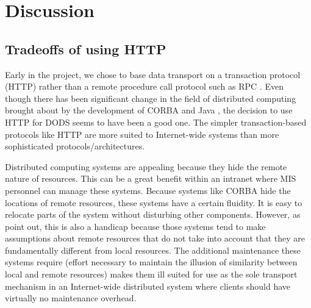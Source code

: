 \documentclass[12pt]{article}
\begin{document}
\section{Discussion}
\label{disc}

\subsection{Tradeoffs of using HTTP}
\label{http}

Early in the project, we chose to base data transport on a transaction
protocol (\acs{HTTP}) rather than a remote procedure call protocol such as
\ac{RPC} \cite{sun:rpc}. Even though there has been significant change in the
field of distributed computing brought about by the development of \ac{CORBA}
\cite{siegel:corba-prog} and Java \cite{harold:java-net}, the decision to use
\acs{HTTP} for \ac{DODS} seems to have been a good one. The simpler
transaction-based protocols like \acs{HTTP} are more suited to
Internet-wide systems than more sophisticated protocols/architectures.

Distributed computing systems are appealing because they hide the remote
nature of resources. This can be a great benefit within an intranet where
\ac{MIS} personnel can manage these systems. Because systems like \ac{CORBA}
hide the locations of remote resources, these systems have a certain
fluidity. It is easy to relocate parts of the system without disturbing other
components.  However, as  point out, this is also
a handicap because those systems tend to make assumptions about remote
resources that do not take into account that they are fundamentally different
from local resources. The additional maintenance these systems require
(effort necessary to maintain the illusion of similarity between local and
remote resources) makes them ill suited for use as the sole transport
mechanism in an Internet-wide distributed system where clients should have
virtually no maintenance overhead.
\end{document}
